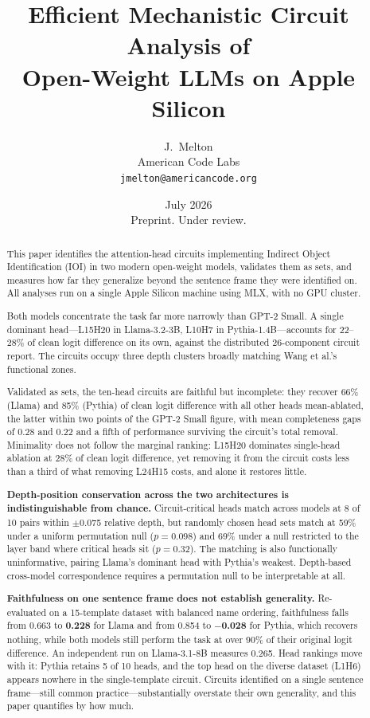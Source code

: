 \documentclass[11pt,a4paper]{article}
\title{\textbf{Efficient Mechanistic Circuit Analysis of\\Open-Weight LLMs on Apple Silicon}}
\author{
  J.\ Melton \\[4pt]
  American Code Labs \\
  \texttt{jmelton@americancode.org}
}
\date{July 2026 \\ \smallskip \small Preprint. Under review.}
\begin{document}
\maketitle

\begin{abstract}
This paper identifies the attention-head circuits implementing Indirect Object
Identification (IOI) in two modern open-weight models, validates them as sets, and
measures how far they generalize beyond the sentence frame they were identified on. All
analyses run on a single Apple Silicon machine using MLX, with no GPU cluster.

Both models concentrate the task far more narrowly than GPT-2 Small. A single dominant
head---L15H20 in Llama-3.2-3B, L10H7 in Pythia-1.4B---accounts for 22--28\% of clean
logit difference on its own, against the distributed 26-component circuit
\citet{wang2022interpretability} report. The circuits occupy three depth clusters broadly matching
Wang et al.'s functional zones.

Validated as sets, the ten-head circuits are faithful but incomplete: they recover 66\%
(Llama) and 85\% (Pythia) of clean logit difference with all other heads mean-ablated,
the latter within two points of the GPT-2 Small figure, with mean completeness gaps of
0.28 and 0.22 and a fifth of performance surviving the circuit's total removal.
Minimality does not follow the marginal ranking: L15H20 dominates single-head ablation
at 28\% of clean logit difference, yet removing it from the circuit costs less than a
third of what removing L24H15 costs, and alone it restores little.

\textbf{Depth-position conservation across the two architectures is indistinguishable
from chance.} Circuit-critical heads match across models at 8 of 10 pairs within
$\pm$0.075 relative depth, but randomly chosen head sets match at 59\% under a uniform
permutation null ($p = 0.098$) and 69\% under a null restricted to the layer band where
critical heads sit ($p = 0.32$). The matching is also functionally uninformative,
pairing Llama's dominant head with Pythia's weakest. Depth-based cross-model
correspondence requires a permutation null to be interpretable at all.

\textbf{Faithfulness on one sentence frame does not establish generality.} Re-evaluated
on a 15-template dataset with balanced name ordering, faithfulness falls from 0.663 to
\textbf{0.228} for Llama and from 0.854 to \textbf{$-$0.028} for Pythia, which recovers
nothing, while both models still perform the task at over 90\% of their original logit
difference. An independent run on Llama-3.1-8B measures 0.265. Head rankings move with
it: Pythia retains 5 of 10 heads, and the top head on the diverse dataset (L1H6) appears
nowhere in the single-template circuit. Circuits identified on a single sentence
frame---still common practice---substantially overstate their own generality, and this
paper quantifies by how much.
\end{abstract}
\end{document}
